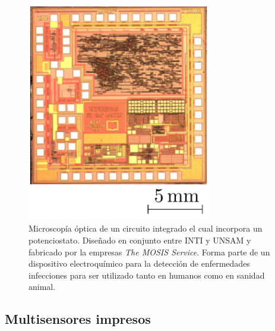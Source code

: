  			\begin{figure}[th!]
			    \begin{center}
			    \includegraphics[width=0.72\textwidth]{Imagenes/potenciostato-chip.pdf}
	       		\caption{Microscopía óptica de un circuito integrado el cual incorpora un potenciostato. Diseñado en conjunto entre INTI y UNSAM y fabricado por la empresas \textit{The MOSIS Service}. Forma parte de un dispositivo electroquímico para la detección de enfermedades infecciones para ser utilizado tanto en humanos como en sanidad animal.}
	         	\label{fig:pote-onchip}
	     		\end{center}
	     		\end{figure}


  \subsection{Multisensores impresos}

